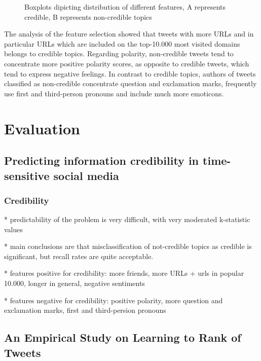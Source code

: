 \documentclass{proseminar}
\begin{document}
\begin{figure}[h]
\centering
{}
\caption{Boxplots dipicting distribution of different features, A represents credible, B represents non-credible topics}
\label{fig:boxCredibility}
\end{figure}

The analysis of the feature selection showed that tweets with more URLs and in particular URLs which are included on the top-10.000 most visited domains belongs to credible topics. 
Regarding polarity, non-credible tweets tend to concentrate more positive polarity scores, as opposite to credible tweets, which tend to express negative feelings.
In contrast to credible topics, authors of tweets classified as non-credible concentrate question and exclamation marks, frequently use first and third-person pronouns and include much more emoticons.



\section{Evaluation}
\subsection{Predicting information credibility in time-sensitive social media}

\subsubsection*{Credibility}
* predictability of the problem is very difficult, with very moderated k-statistic values

* main conclusions are that misclassification of not-credible topics as credible is significant, but recall rates are quite acceptable.

* features positive for credibility: more friends, more URLs + urls in popular 10.000, longer in general, negative sentiments

* features negative for credibility: positive polarity, more question and exclamation marks, first and third-persion pronouns


\subsection{An Empirical Study on Learning to Rank of Tweets}
\end{document}
